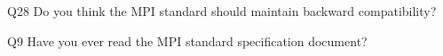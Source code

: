 \begin{description}%
\item{Q28} Do you think the MPI standard should maintain backward compatibility?%
\item{Q9} Have you ever read the MPI standard specification document?%
\end{description}%
